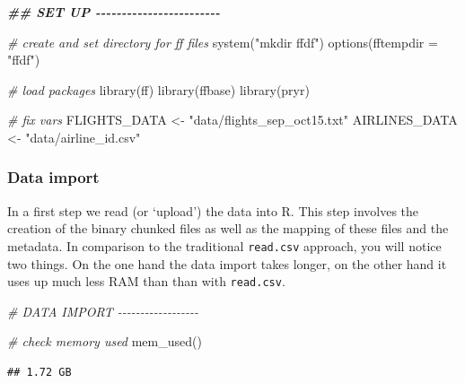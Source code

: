 \documentclass[
  12pt,
]{style/krantz}
\newenvironment{Shaded}{\begin{snugshade}}{\end{snugshade}}
\newcommand{\AttributeTok}[1]{\textcolor[rgb]{0.77,0.63,0.00}{#1}}
\newcommand{\CommentTok}[1]{\textcolor[rgb]{0.56,0.35,0.01}{\textit{#1}}}
\newcommand{\DocumentationTok}[1]{\textcolor[rgb]{0.56,0.35,0.01}{\textbf{\textit{#1}}}}
\newcommand{\FunctionTok}[1]{\textcolor[rgb]{0.00,0.00,0.00}{#1}}
\newcommand{\NormalTok}[1]{#1}
\newcommand{\OtherTok}[1]{\textcolor[rgb]{0.56,0.35,0.01}{#1}}
\newcommand{\StringTok}[1]{\textcolor[rgb]{0.31,0.60,0.02}{#1}}
\begin{document}
\begin{Shaded}
\begin{Highlighting}[]
\DocumentationTok{\#\# SET UP {-}{-}{-}{-}{-}{-}{-}{-}{-}{-}{-}{-}{-}{-}{-}{-}{-}{-}{-}{-}{-}{-}{-}{-}}

\CommentTok{\# create and set directory for ff files}
\FunctionTok{system}\NormalTok{(}\StringTok{"mkdir ffdf"}\NormalTok{)}
\FunctionTok{options}\NormalTok{(}\AttributeTok{fftempdir =} \StringTok{"ffdf"}\NormalTok{)}

\CommentTok{\# load packages}
\FunctionTok{library}\NormalTok{(ff)}
\FunctionTok{library}\NormalTok{(ffbase)}
\FunctionTok{library}\NormalTok{(pryr)}

\CommentTok{\# fix vars}
\NormalTok{FLIGHTS\_DATA }\OtherTok{\textless{}{-}} \StringTok{"data/flights\_sep\_oct15.txt"}
\NormalTok{AIRLINES\_DATA }\OtherTok{\textless{}{-}} \StringTok{"data/airline\_id.csv"}
\end{Highlighting}
\end{Shaded}

\hypertarget{data-import-1}{%
\subsubsection{Data import}\label{data-import-1}}

In a first step we read (or `upload') the data into R. This step involves the creation of the binary chunked files as well as the mapping of these files and the metadata. In comparison to the traditional \texttt{read.csv} approach, you will notice two things. On the one hand the data import takes longer, on the other hand it uses up much less RAM than than with \texttt{read.csv}.

\begin{Shaded}
\begin{Highlighting}[]
\CommentTok{\# DATA IMPORT {-}{-}{-}{-}{-}{-}{-}{-}{-}{-}{-}{-}{-}{-}{-}{-}{-}{-}}

\CommentTok{\# check memory used}
\FunctionTok{mem\_used}\NormalTok{()}
\end{Highlighting}
\end{Shaded}

\begin{verbatim}
## 1.72 GB
\end{verbatim}
\end{document}
